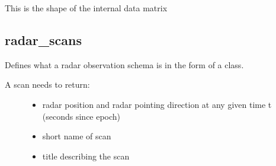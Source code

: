 \documentclass[letterpaper,10pt,english]{sphinxmanual}
\begin{document}
\begin{fulllineitems}
\begin{fulllineitems}
\end{fulllineitems}


\begin{fulllineitems}
\label{\detokenize{modules/population:population.Population.save}}
\end{fulllineitems}


\begin{fulllineitems}
\label{\detokenize{modules/population:population.Population.shape}}
This is the shape of the internal data matrix

\end{fulllineitems}


\end{fulllineitems}



\subsection{radar\_scans}
\label{\detokenize{modules/radar_scans:module-radar_scans}}\label{\detokenize{modules/radar_scans:radar-scans}}\label{\detokenize{modules/radar_scans::doc}}
Defines what a radar observation schema is in the form of a class.
\begin{description}
\item[{A scan needs to return:}] \leavevmode\begin{itemize}
\item {} 
radar position and radar pointing direction at any given time t (seconds since epoch)

\item {} 
short name of scan

\item {} 
title describing the scan

\end{itemize}

\end{description}
\end{document}
